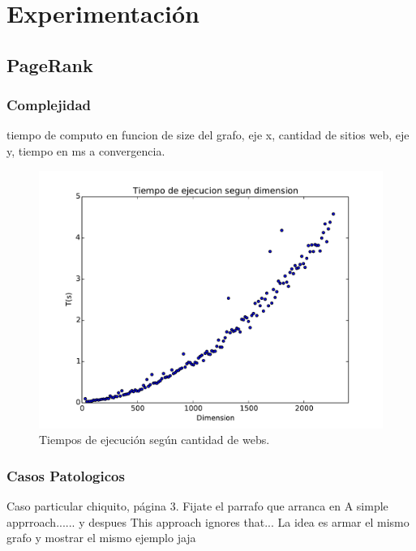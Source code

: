 \section{Experimentación}

\subsection{PageRank}
\subsubsection{Complejidad}
tiempo de computo en funcion de size del grafo, eje x, cantidad de sitios web, eje y, tiempo en ms a convergencia.

\begin{figure}[h]
\centering
\includegraphics[scale=0.7]{images/complejidad.pdf}
\caption{Tiempos de ejecución según cantidad de webs.}
\label{timePageRank}
\end{figure}

\subsubsection{Casos Patologicos}
Caso particular chiquito, página 3. Fijate el parrafo que arranca en A simple apprroach...... y despues This approach ignores that... La idea es armar el mismo grafo y mostrar el mismo ejemplo jaja

